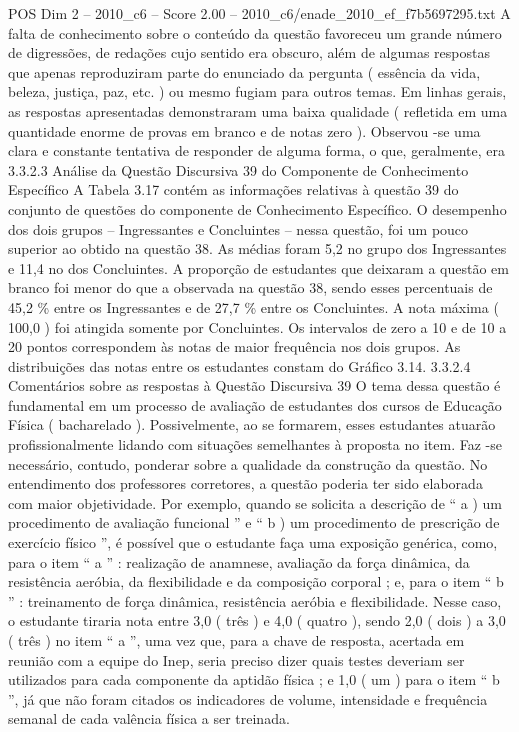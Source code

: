 \begin{textsample}{POS Dim 2 – 2010\_c6 – Score 2.00 – 2010\_c6/enade\_2010\_ef\_f7b5697295.txt}
A falta de conhecimento sobre o conteúdo da questão favoreceu um grande número de digressões, de redações cujo sentido era obscuro, além de algumas respostas que apenas reproduziram parte do enunciado da pergunta ( essência da vida, beleza, justiça, paz, etc. ) ou mesmo fugiam para outros temas.
Em linhas gerais, as respostas apresentadas demonstraram uma baixa qualidade ( refletida em uma quantidade enorme de provas em branco e de notas zero ).
Observou -se uma clara e constante tentativa de responder de alguma forma, o que, geralmente, era 3.3.2.3 Análise da Questão Discursiva 39 do Componente de Conhecimento Específico A Tabela 3.17 contém as informações relativas à questão 39 do conjunto de questões do componente de Conhecimento Específico.
O desempenho dos dois grupos – Ingressantes e Concluintes – nessa questão, foi um pouco superior ao obtido na questão 38.
As médias foram 5,2 no grupo dos Ingressantes e 11,4 no dos Concluintes.
A proporção de estudantes que deixaram a questão em branco foi menor do que a observada na questão 38, sendo esses percentuais de 45,2 \% entre os Ingressantes e de 27,7 \% entre os Concluintes.
A nota máxima ( 100,0 ) foi atingida somente por Concluintes.
Os intervalos de zero a 10 e de 10 a 20 pontos correspondem às notas de maior frequência nos dois grupos.
As distribuições das notas entre os estudantes constam do Gráfico 3.14. 3.3.2.4 Comentários sobre as respostas à Questão Discursiva 39 O tema dessa questão é fundamental em um processo de avaliação de estudantes dos cursos de Educação Física ( bacharelado ).
Possivelmente, ao se formarem, esses estudantes atuarão profissionalmente lidando com situações semelhantes à proposta no item.
Faz -se necessário, contudo, ponderar sobre a qualidade da construção da questão.
No entendimento dos professores corretores, a questão poderia ter sido elaborada com maior objetividade.
Por exemplo, quando se solicita a descrição de “ a ) um procedimento de avaliação funcional ” e “ b ) um procedimento de prescrição de exercício físico ”, é possível que o estudante faça uma exposição genérica, como, para o item “ a ” : realização de anamnese, avaliação da força dinâmica, da resistência aeróbia, da flexibilidade e da composição corporal ; e, para o item “ b ” : treinamento de força dinâmica, resistência aeróbia e flexibilidade.
Nesse caso, o estudante tiraria nota entre 3,0 ( três ) e 4,0 ( quatro ), sendo 2,0 ( dois ) a 3,0 ( três ) no item “ a ”, uma vez que, para a chave de resposta, acertada em reunião com a equipe do Inep, seria preciso dizer quais testes deveriam ser utilizados para cada componente da aptidão física ; e 1,0 ( um ) para o item “ b ”, já que não foram citados os indicadores de volume, intensidade e frequência semanal de cada valência física a ser treinada.

\end{textsample}
